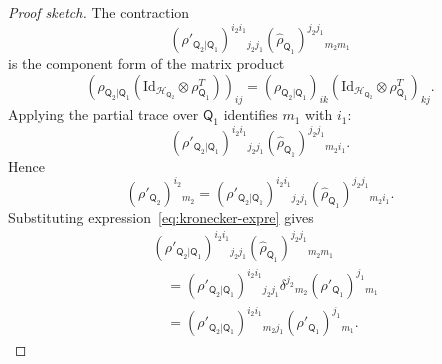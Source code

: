 \documentclass[
    aps,
    pra,
    reprint,
    superscriptaddress,
    nofootinbib
]{revtex4-2}
\theoremstyle{definition}
\theoremstyle{plain}
\begin{document}
\begin{proof}[Proof sketch]
        The contraction
        \begin{equation}
            (\rho'_{\mathsf{Q}_{2}|\mathsf{Q}_{1}})
            ^{i_{2}i_{1}}{}_{j_{2}j_{1}}
            (\hat{\rho}_{\mathsf{Q}_{1}})
            ^{j_{2}j_{1}}{}_{m_{2}m_{1}}
        \end{equation}
        is the component form of the matrix product
        \begin{equation}
            \left(
                \rho_{\mathsf{Q}_{2}|\mathsf{Q}_{1}}
                \left(
                    \mathrm{Id}_{\mathcal{H}_{\mathsf{Q}_{2}}}
                    \otimes
                    \rho_{\mathsf{Q}_{1}}^{T}
                \right)
            \right)_{ij}=
            (\rho_{\mathsf{Q}_{2}|\mathsf{Q}_{1}})_{ik}
            \left(
                \mathrm{Id}_{\mathcal{H}_{\mathsf{Q}_{2}}}
                \otimes
                \rho_{\mathsf{Q}_{1}}^{T}
            \right)_{kj}.
        \end{equation}
        Applying the partial trace over $\mathsf{Q}_{1}$ identifies
        $m_{1}$ with $i_{1}$:
        \begin{equation}
            (\rho'_{\mathsf{Q}_{2}|\mathsf{Q}_{1}})
            ^{i_{2}i_{1}}{}_{j_{2}j_{1}}
            (\hat{\rho}_{\mathsf{Q}_{1}})
            ^{j_{2}j_{1}}{}_{m_{2}i_{1}}.
        \end{equation}
        Hence
        \begin{equation}
            (\rho'_{\mathsf{Q}_{2}})^{i_{2}}{}_{m_{2}}
            =
            (\rho'_{\mathsf{Q}_{2}|\mathsf{Q}_{1}})
            ^{i_{2}i_{1}}{}_{j_{2}j_{1}}
            (\hat{\rho}_{\mathsf{Q}_{1}})
            ^{j_{2}j_{1}}{}_{m_{2}i_{1}}.
        \end{equation}
        Substituting expression~\eqref{eq:kronecker-expre} gives
        \begin{equation}
        \begin{aligned}
        &(\rho'_{\mathsf{Q}_{2}|\mathsf{Q}_{1}})
        ^{i_{2}i_{1}}{}_{j_{2}j_{1}}
        (\hat{\rho}_{\mathsf{Q}_{1}})
        ^{j_{2}j_{1}}{}_{m_{2}m_{1}}\\
        &\quad=
        (\rho'_{\mathsf{Q}_{2}|\mathsf{Q}_{1}})
        ^{i_{2}i_{1}}{}_{j_{2}j_{1}}
        \delta^{j_{2}}{}_{m_{2}}
        (\rho'_{\mathsf{Q}_{1}})^{j_{1}}{}_{m_{1}}\\
        &\quad=
        (\rho'_{\mathsf{Q}_{2}|\mathsf{Q}_{1}})
        ^{i_{2}i_{1}}{}_{m_{2}j_{1}}
        (\rho'_{\mathsf{Q}_{1}})^{j_{1}}{}_{m_{1}}.
        \end{aligned}

\end{equation}
\end{proof}
\end{document}
